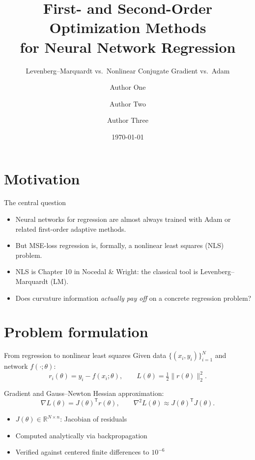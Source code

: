 \documentclass[10pt,aspectratio=169]{beamer}
\title{First- and Second-Order Optimization Methods\\ for Neural Network Regression}
\subtitle{Levenberg--Marquardt vs.\ Nonlinear Conjugate Gradient vs.\ Adam}
\author{Author One \and Author Two \and Author Three}
\institute{MATE 6026 --- Numerical Optimization}
\date{\today}
\newcommand{\R}{\mathbb{R}}
\newcommand{\T}{^{\mathsf{T}}}
\newcommand{\grad}{\nabla}
\begin{document}
\maketitle

\section{Motivation}

\begin{frame}{The central question}
  \begin{itemize}
    \item Neural networks for regression are almost always trained with
          \alert{Adam} or related first-order adaptive methods.
    \item But MSE-loss regression is, formally, a
          \alert{nonlinear least squares} (NLS) problem.
    \item NLS is Chapter 10 in Nocedal \& Wright: the classical tool is
          \alert{Levenberg--Marquardt (LM)}.
    \vspace{0.5em}
    \item[$\rightarrow$] Does curvature information \emph{actually pay off}
          on a concrete regression problem?
  \end{itemize}
\end{frame}

\section{Problem formulation}

\begin{frame}{From regression to nonlinear least squares}
  Given data $\{(x_i, y_i)\}_{i=1}^N$ and network $f(\cdot; \theta)$:
  \begin{equation*}
    r_i(\theta) = y_i - f(x_i; \theta),
    \qquad
    L(\theta) = \tfrac{1}{2}\|r(\theta)\|_2^2.
  \end{equation*}

  Gradient and Gauss--Newton Hessian approximation:
  \begin{equation*}
    \grad L(\theta) = J(\theta)\T r(\theta),
    \qquad
    \grad^2 L(\theta) \approx J(\theta)\T J(\theta).
  \end{equation*}

  \begin{itemize}
    \item $J(\theta) \in \R^{N \times n}$: Jacobian of residuals
    \item Computed analytically via backpropagation
    \item Verified against centered finite differences to $10^{-6}$
  \end{itemize}
\end{frame}
\end{document}
